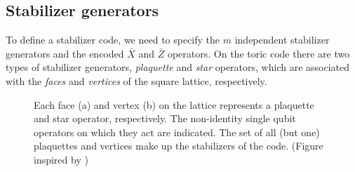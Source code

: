 \subsection{Stabilizer generators}

To define a stabilizer code, we need to specify the $m$ independent stabilizer generators and the encoded $\bar{X}$ and $\bar{Z}$ operators. On the toric code there are two types of stabilizer generators, \emph{plaquette} and \emph{star} operators, which are associated with the \emph{faces} and \emph{vertices} of the square lattice, respectively.

\begin{figure}
  \centering
  \hspace{1cm}

  \begin{center}
    \hspace{1cm}
  \end{center}

  \caption{Each face (a) and vertex (b) on the lattice represents a plaquette and star operator, respectively. The non-identity single qubit operators on which they act are indicated. The set of all (but one) plaquettes and vertices make up the stabilizers of the code. (Figure inspired by \cite{browne})}\label{sf:fig_stabilizers}
\end{figure}

